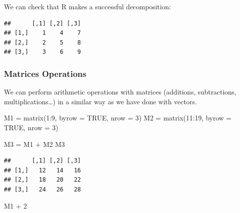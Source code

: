 \documentclass[
]{book}
\newenvironment{Shaded}{\begin{snugshade}}{\end{snugshade}}
\newcommand{\AttributeTok}[1]{\textcolor[rgb]{0.77,0.63,0.00}{#1}}
\newcommand{\ConstantTok}[1]{\textcolor[rgb]{0.00,0.00,0.00}{#1}}
\newcommand{\DecValTok}[1]{\textcolor[rgb]{0.00,0.00,0.81}{#1}}
\newcommand{\FunctionTok}[1]{\textcolor[rgb]{0.00,0.00,0.00}{#1}}
\newcommand{\NormalTok}[1]{#1}
\newcommand{\OtherTok}[1]{\textcolor[rgb]{0.56,0.35,0.01}{#1}}
\newcommand{\SpecialCharTok}[1]{\textcolor[rgb]{0.00,0.00,0.00}{#1}}
\begin{document}
We can check that R makes a successful decomposition:

\begin{Shaded}
\end{Shaded}

\begin{verbatim}
##      [,1] [,2] [,3]
## [1,]    1    4    7
## [2,]    2    5    8
## [3,]    3    6    9
\end{verbatim}

\hypertarget{matrices-operations}{%
\subsubsection{Matrices Operations}\label{matrices-operations}}

We can perform arithmetic operations with matrices (additions, subtractions, multiplications\ldots) in a similar way as we have done with vectors.

\begin{Shaded}
\begin{Highlighting}[]
\NormalTok{M1 }\OtherTok{=} \FunctionTok{matrix}\NormalTok{(}\DecValTok{1}\SpecialCharTok{:}\DecValTok{9}\NormalTok{, }\AttributeTok{byrow =} \ConstantTok{TRUE}\NormalTok{, }\AttributeTok{nrow =} \DecValTok{3}\NormalTok{)}
\NormalTok{M2 }\OtherTok{=} \FunctionTok{matrix}\NormalTok{(}\DecValTok{11}\SpecialCharTok{:}\DecValTok{19}\NormalTok{, }\AttributeTok{byrow =} \ConstantTok{TRUE}\NormalTok{, }\AttributeTok{nrow =} \DecValTok{3}\NormalTok{)}

\NormalTok{M3 }\OtherTok{=}\NormalTok{ M1 }\SpecialCharTok{+}\NormalTok{ M2}
\NormalTok{M3}
\end{Highlighting}
\end{Shaded}

\begin{verbatim}
##      [,1] [,2] [,3]
## [1,]   12   14   16
## [2,]   18   20   22
## [3,]   24   26   28
\end{verbatim}

\begin{Shaded}
\begin{Highlighting}[]
\NormalTok{M1 }\SpecialCharTok{+} \DecValTok{2}
\end{Highlighting}
\end{Shaded}
\end{document}
